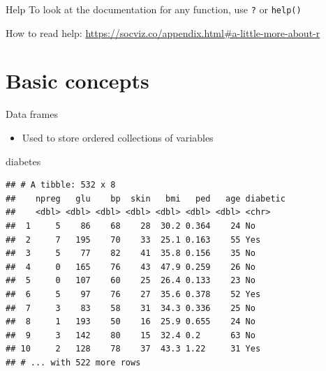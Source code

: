\documentclass[
  ignorenonframetext,
]{beamer}
\newenvironment{Shaded}{\begin{snugshade}}{\end{snugshade}}
\newcommand{\NormalTok}[1]{#1}
\providecommand{\tightlist}{%
  \setlength{\itemsep}{0pt}\setlength{\parskip}{0pt}}
\begin{document}
\begin{frame}[fragile]{Help}
\protect\hypertarget{help}{}
To look at the documentation for any function, use \texttt{?} or
\texttt{help()}

How to read help:
\url{https://socviz.co/appendix.html\#a-little-more-about-r}
\end{frame}

\hypertarget{basic-concepts}{%
\section{Basic concepts}\label{basic-concepts}}

\begin{frame}[fragile]{Data frames}
\protect\hypertarget{data-frames}{}
\begin{itemize}
\tightlist
\item
  Used to store ordered collections of variables
\end{itemize}

\begin{Shaded}
\begin{Highlighting}[]
\NormalTok{diabetes}
\end{Highlighting}
\end{Shaded}

\begin{verbatim}
## # A tibble: 532 x 8
##    npreg   glu    bp  skin   bmi   ped   age diabetic
##    <dbl> <dbl> <dbl> <dbl> <dbl> <dbl> <dbl> <chr>   
##  1     5    86    68    28  30.2 0.364    24 No      
##  2     7   195    70    33  25.1 0.163    55 Yes     
##  3     5    77    82    41  35.8 0.156    35 No      
##  4     0   165    76    43  47.9 0.259    26 No      
##  5     0   107    60    25  26.4 0.133    23 No      
##  6     5    97    76    27  35.6 0.378    52 Yes     
##  7     3    83    58    31  34.3 0.336    25 No      
##  8     1   193    50    16  25.9 0.655    24 No      
##  9     3   142    80    15  32.4 0.2      63 No      
## 10     2   128    78    37  43.3 1.22     31 Yes     
## # ... with 522 more rows
\end{verbatim}
\end{frame}
\end{document}
